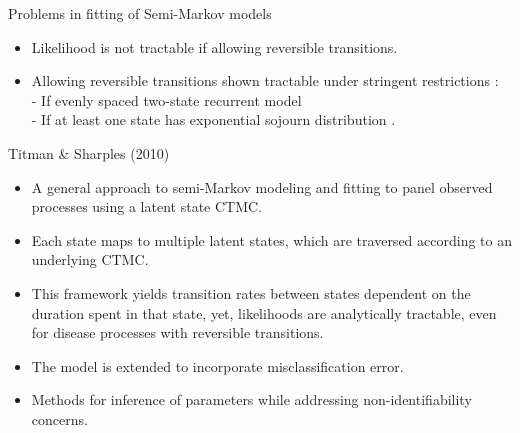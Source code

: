 \documentclass{beamer}
\begin{document}
\begin{frame}{Problems in fitting of Semi-Markov models}
\begin{itemize}
\item Likelihood is not tractable if allowing reversible transitions. \citep{chen2004semi,foucher2010flexible}
\vspace{3mm}
\item Allowing reversible transitions shown tractable under stringent restrictions : \\ \vspace{1mm} - If evenly spaced two-state recurrent model \citep{rosychuk2001semi}\\ \vspace{1mm}- If at least one state has exponential sojourn distribution \citep{kang2007statistical}.
\end{itemize}
\end{frame}
\begin{frame}{Titman \& Sharples (2010)}
\begin{itemize}
\item A general approach to semi-Markov modeling and fitting to panel observed processes using a latent state CTMC.\vspace{2mm}
\item Each state maps to multiple latent states, which are traversed according to an underlying CTMC.\vspace{2mm}
\item This framework yields transition rates between states dependent on the duration spent in that state, yet, likelihoods are analytically tractable, even for disease processes with reversible transitions.\vspace{2mm}
\item The model is extended to incorporate misclassification error.\vspace{2mm}
\item Methods for inference of parameters while addressing non-identifiability concerns.

\end{itemize}
\end{frame}
\end{document}
